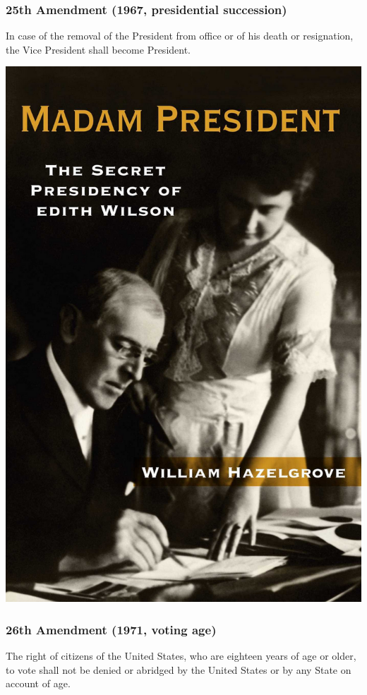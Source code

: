 \documentclass[aspectratio=169]{beamer}
\theoremstyle{principle}
\begin{document}
\begin{frame}
\frametitle{25th Amendment (1967, presidential succession)}
In case of the removal of the President from office or of his death or resignation, the Vice President shall become President.
\begin{center}
\includegraphics[scale=0.25]{madam_president.png}
\end{center}

\end{frame}

\begin{frame}
\frametitle{26th Amendment (1971, voting age)}
The right of citizens of the United States, who are eighteen years of age or older, to vote shall not be denied or abridged by the United States or by any State on account of age. 
\end{frame}
\end{document}
